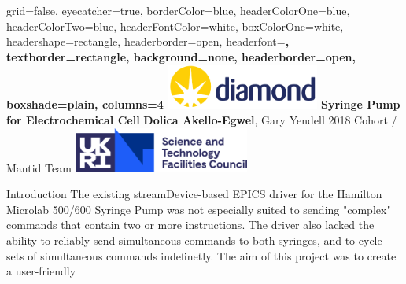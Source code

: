 \documentclass[a0paper,landscape]{baposter}
\begin{document}

\background{}

\begin{poster}{
	grid=false,
	eyecatcher=true, 
	borderColor=blue,
	headerColorOne=blue,
	headerColorTwo=blue,
	headerFontColor=white,
	boxColorOne=white,
	headershape=rectangle,
	headerborder=open,
	headerfont=\Large\sf\bf,
	textborder=rectangle,
	background=none,
	headerborder=open,
    boxshade=plain,
    columns=4
}
{\includegraphics[height=4em]{images/diamondlogo}} 
{\bf \color{blue} Syringe Pump for Electrochemical Cell \vspace{0.5em}} %
{\textbf{Dolica Akello-Egwel}, Gary Yendell \hspace{12pt} 2018 Cohort / Mantid Team} %
{\includegraphics[height=4em]{images/stfclogo}} 
\begin{posterbox}[name=introduction,column=0]{Introduction}
The existing streamDevice-based EPICS driver for the Hamilton Microlab 500/600 Syringe Pump was not
especially suited to sending "complex" commands that contain two or more instructions.
The driver also lacked the ability to reliably send simultaneous commands to both syringes, and to
cycle sets of simultaneous commands indefinetly. The aim of this project was to create a user-friendly

\end{posterbox}
\end{poster}
\end{document}
